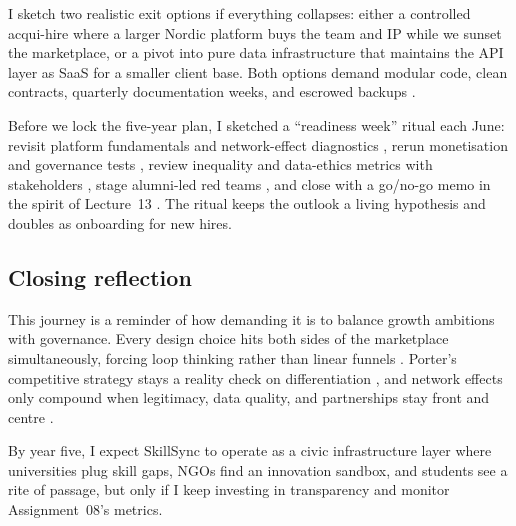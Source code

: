 I sketch two realistic exit options if everything collapses: either a controlled acqui-hire where a larger Nordic platform buys the team and IP while we sunset the marketplace, or a pivot into pure data infrastructure that maintains the API layer as SaaS for a smaller client base. Both options demand modular code, clean contracts, quarterly documentation weeks, and escrowed backups \citep{Reillier2017}.

Before we lock the five-year plan, I sketched a ``readiness week'' ritual each June: revisit platform fundamentals and network-effect diagnostics \citep{Lecture01,Lecture02}, rerun monetisation and governance tests \citep{Lecture05,Lecture10}, review inequality and data-ethics metrics with stakeholders \citep{Lecture08,Lecture11}, stage alumni-led red teams \citep{Lecture12}, and close with a go/no-go memo in the spirit of Lecture~13 \citep{Lecture13}. The ritual keeps the outlook a living hypothesis and doubles as onboarding for new hires.

\subsection*{Closing reflection}
This journey is a reminder of how demanding it is to balance growth ambitions with governance. Every design choice hits both sides of the marketplace simultaneously, forcing loop thinking rather than linear funnels \citep{Choudary2016}. Porter’s competitive strategy stays a reality check on differentiation \citep{Porter2008}, and network effects only compound when legitimacy, data quality, and partnerships stay front and centre \citep{Srnicek2017}.

By year five, I expect SkillSync to operate as a civic infrastructure layer where universities plug skill gaps, NGOs find an innovation sandbox, and students see a rite of passage, but only if I keep investing in transparency and monitor Assignment~08's metrics.

